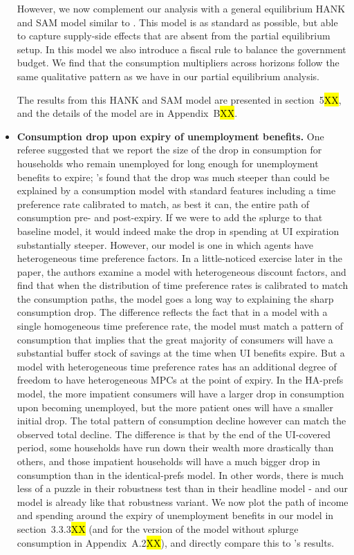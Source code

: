 \begin{itemize}
	However, we now complement our analysis with a general equilibrium HANK and SAM model similar to \citet{Ravn2017}. This model is as standard as possible, but able to capture supply-side effects that are absent from the partial equilibrium setup. In this model we also introduce a fiscal rule to balance the government budget. We find that the consumption multipliers across horizons follow the same qualitative pattern as we have in our partial equilibrium analysis.
	
	The results from this HANK and SAM model are presented in section~5\hl{XX}, and the details of the model are in Appendix~B\hl{XX}.
	
      \item \textbf{Consumption drop upon expiry of unemployment benefits.} One referee suggested that we report the size of the drop in consumption for households who remain unemployed for long enough for unemployment benefits to expire; \citeauthor{ganongConsumer2019}'s found that the drop was much steeper than could be explained by a consumption model with standard features including a time preference rate calibrated to match, as best it can, the entire path of consumption pre- and post-expiry.  If we were to add the splurge to that baseline model, it would indeed make the drop in spending at UI expiration substantially steeper. However, our model is one in which agents have heterogeneous time preference factors.  In a little-noticed exercise later in the \citeauthor{gangongconsumer2019} paper, the authors examine a model with heterogeneous discount factors, and find that when the distribution of time preference rates is calibrated to match the consumption paths, the model goes a long way to explaining the sharp consumption drop.  The difference reflects the fact that in a model with a single homogeneous time preference rate, the model must match a pattern of consumption that implies that the great majority of consumers will have a substantial buffer stock of savings at the time when UI benefits expire.  But a model with heterogeneous time preference rates has an additional degree of freedom to have heterogeneous MPCs at the point of expiry.  In the HA-prefs model, the more impatient consumers will have a larger drop in consumption upon becoming unemployed, but the more patient ones will have a smaller initial drop. The total pattern of consumption decline however can match the observed total decline.  The difference is that by the end of the UI-covered period, some households have run down their wealth more drastically than others, and those impatient households will have a much bigger drop in consumption than in the identical-prefs model.  In other words, there is much less of a puzzle in their robustness test than in their headline model - and our model is already like that robustness variant.
        We now plot the path of income and spending around the expiry of unemployment benefits in our model in section~3.3.3\hl{XX} (and for the version of the model without splurge consumption in Appendix~A.2\hl{XX}), and directly compare this to \citeauthor{ganongConsumer2019}'s results.
	
	
\end{itemize}
